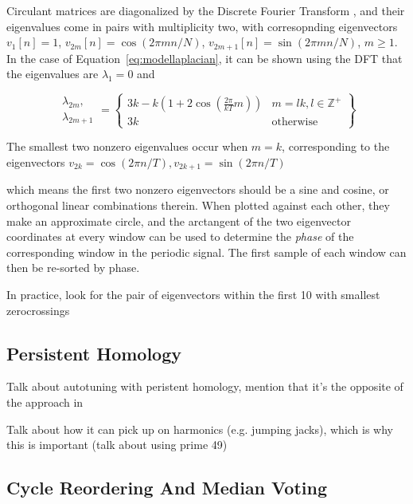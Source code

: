 \documentclass{article}
\begin{document}
Circulant matrices are diagonalized by the Discrete Fourier Transform \cite{godsil2013algebraic}, and their eigenvalues come in pairs with multiplicity two, with corresopnding eigenvectors $v_1[n] = 1$, $v_{2m}[n] = \cos(2 \pi mn / N)$, $v_{2m+1}[n] = \sin(2 \pi m n / N)$, $m \geq 1$.  In the case of Equation~\ref{eq:modellaplacian}, it can be shown using the DFT that the eigenvalues are $\lambda_1 = 0$ and 

\begin{equation}
\begin{array}{cc}\lambda_{2m},\\\lambda_{2m+1}\end{array} = \left\{ \begin{array}{cc} 3k - k\left( 1 + 2 \cos \left( \frac{2 \pi}{kT} m \right) \right) & m = lk, l \in \mathbb{Z}^+ \\ 3k & \text{otherwise}  \end{array} \right\} 
\end{equation}

The smallest two nonzero eigenvalues occur when $m = k$, corresponding to the eigenvectors $v_{2k} = \cos(2 \pi n / T), v_{2k+1} = \sin(2 \pi n / T)$





which means the first two nonzero eigenvectors should be a sine and cosine, or orthogonal linear combinations therein.  When plotted against each other, they make an approximate circle, and the arctangent of the two eigenvector coordinates at every window can be used to determine the {\em phase} of the corresponding window in the periodic signal.  The first sample of each window can then be re-sorted by phase.


In practice, look for the pair of eigenvectors within the first 10 with smallest zerocrossings

\subsection{Persistent Homology}

Talk about autotuning with peristent homology, mention that it's the opposite of the approach in \cite{bendich2011improving}

Talk about how it can pick up on harmonics (e.g. jumping jacks), which is why this is important (talk about using prime 49)

\subsection{Cycle Reordering And Median Voting}
\label{sec:cyclereordering}
\end{document}
